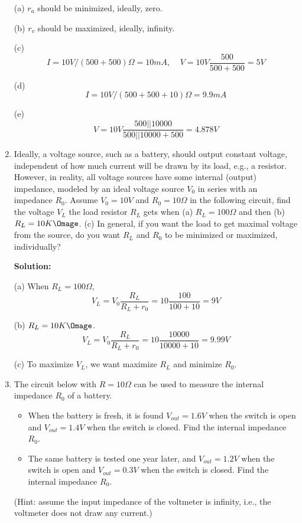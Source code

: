 \begin{enumerate}
  (a) $r_a$ should be minimized, ideally, zero.

  (b) $r_v$ should be maximized, ideally, infinity.

  (c) \[ I=10V/(500+500)\Omega=10 mA,\;\;\;\;V=10V\frac{500}{500+500}=5 V \]

  (d) \[ I=10V/(500+500+10)\Omega=9.9 mA \]

  (e) \[ V=10V\frac{500||10000}{500||10000+500}=4.878 V \]

\item Ideally, a voltage source, such as a battery, should output constant voltage,
  independent of how much current will be drawn by its load, e.g., a resistor. However, 
  in reality, all voltage sources have some internal (output) impedance, modeled by an 
  ideal voltage source $V_0$ in series with an impedance $R_0$. Assume $V_0=10V$ and 
  $R_0=10\Omega$ in the following circuit, find the voltage $V_L$ the load resistor 
  $R_L$ gets when (a) $R_L=100 \Omega$ and then (b) $R_L=10K\Omage$. 
  (c) In general, if you want the load to get maximal voltage from the source, do you 
  want $R_L$ and $R_0$ to be minimized or maximized, individually?


  {\bf Solution:}

  (a) When $R_L=100 \Omega$, 
  \[V_L=V_0 \frac{R_L}{R_L+r_0}=10 \frac{100}{100+10}=9 V \]

  (b) $R_L=10K\Omage$.
  \[V_L=V_0 \frac{R_L}{R_L+r_0}=10 \frac{10000}{10000+10}=9.99 V \]

  (c) To maximize $V_L$, we want maximize $R_L$ and minimize $R_0$.

\item The circuit below with $R=10 \Omega$ can be used to measure the internal 
  impedance $R_0$ of a battery.
  \begin{itemize}
    \item When the battery is fresh, it is found $V_{out}=1.6V$ when the switch is open 
      and $V_{out}=1.4V$ when the switch is closed. Find the internal impedance $R_0$.
    \item The same battery is tested one year later, and $V_{out}=1.2V$ when the switch 
      is open and $V_{out}=0.3V$ when the switch is closed. Find the internal impedance 
      $R_0$.
  \end{itemize}
(Hint: assume the input impedance of the voltmeter is infinity, i.e., the voltmeter
  does not draw any current.)



\end{enumerate}

